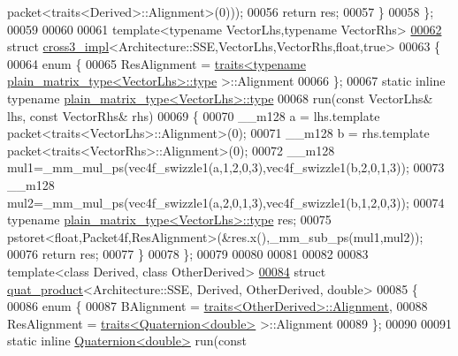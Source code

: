 \begin{DoxyCode}
      packet<traits<Derived>::Alignment>(0)));
00056     \textcolor{keywordflow}{return} res;
00057   \}
00058 \};
00059 
00060 
00061 \textcolor{keyword}{template}<\textcolor{keyword}{typename} VectorLhs,\textcolor{keyword}{typename} VectorRhs>
\hyperlink{struct_eigen_1_1internal_1_1cross3__impl_3_01_architecture_1_1_s_s_e_00_01_vector_lhs_00_01_vect981fca9d3c0a247b027e5ff23e43a093}{00062} \textcolor{keyword}{struct }\hyperlink{struct_eigen_1_1internal_1_1cross3__impl}{cross3\_impl}<Architecture::SSE,VectorLhs,VectorRhs,float,true>
00063 \{
00064   \textcolor{keyword}{enum} \{
00065     ResAlignment = \hyperlink{struct_eigen_1_1internal_1_1traits}{traits<typename plain\_matrix\_type<VectorLhs>::type}
      >::Alignment
00066   \};
00067   \textcolor{keyword}{static} \textcolor{keyword}{inline} \textcolor{keyword}{typename} \hyperlink{struct_eigen_1_1internal_1_1plain__matrix__type}{plain\_matrix\_type<VectorLhs>::type}
00068   run(\textcolor{keyword}{const} VectorLhs& lhs, \textcolor{keyword}{const} VectorRhs& rhs)
00069   \{
00070     \_\_m128 a = lhs.template packet<traits<VectorLhs>::Alignment>(0);
00071     \_\_m128 b = rhs.template packet<traits<VectorRhs>::Alignment>(0);
00072     \_\_m128 mul1=\_mm\_mul\_ps(vec4f\_swizzle1(a,1,2,0,3),vec4f\_swizzle1(b,2,0,1,3));
00073     \_\_m128 mul2=\_mm\_mul\_ps(vec4f\_swizzle1(a,2,0,1,3),vec4f\_swizzle1(b,1,2,0,3));
00074     \textcolor{keyword}{typename} \hyperlink{struct_eigen_1_1internal_1_1plain__matrix__type}{plain\_matrix\_type<VectorLhs>::type} res;
00075     pstoret<float,Packet4f,ResAlignment>(&res.x(),\_mm\_sub\_ps(mul1,mul2));
00076     \textcolor{keywordflow}{return} res;
00077   \}
00078 \};
00079 
00080 
00081 
00082 
00083 \textcolor{keyword}{template}<\textcolor{keyword}{class} Derived, \textcolor{keyword}{class} OtherDerived>
\hyperlink{struct_eigen_1_1internal_1_1quat__product_3_01_architecture_1_1_s_s_e_00_01_derived_00_01_other_derived_00_01double_01_4}{00084} \textcolor{keyword}{struct }\hyperlink{struct_eigen_1_1internal_1_1quat__product}{quat\_product}<Architecture::SSE, Derived, OtherDerived, double>
00085 \{
00086   \textcolor{keyword}{enum} \{
00087     BAlignment = \hyperlink{struct_eigen_1_1internal_1_1traits}{traits<OtherDerived>::Alignment},
00088     ResAlignment = \hyperlink{struct_eigen_1_1internal_1_1traits}{traits<Quaternion<double>} >::Alignment
00089   \};
00090 
00091   \textcolor{keyword}{static} \textcolor{keyword}{inline} \hyperlink{group___geometry___module_class_eigen_1_1_quaternion}{Quaternion<double>} run(\textcolor{keyword}{const} 

\end{DoxyCode}
